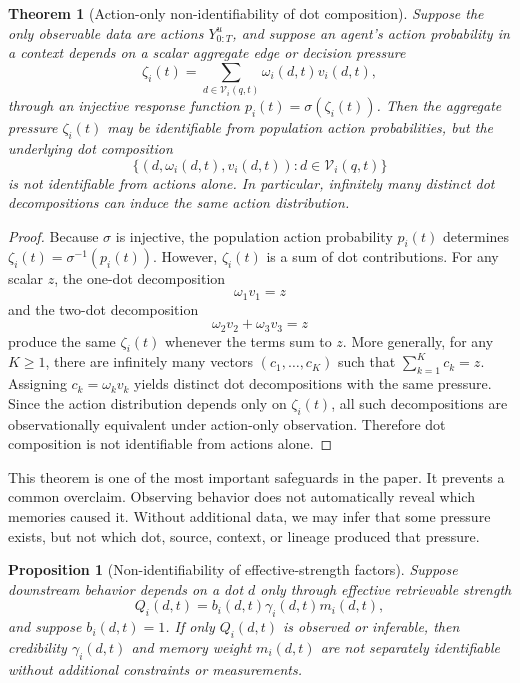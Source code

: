 \documentclass[11pt]{article}
\newtheorem{theorem}{Theorem}
\newtheorem{proposition}{Proposition}
\theoremstyle{remark}
\begin{document}
\begin{theorem}[Action-only non-identifiability of dot composition]\label{thm:action-only-nonidentifiability}
Suppose the only observable data are actions $Y^u_{0:T}$, and suppose an
agent's action probability in a context depends on a scalar aggregate
edge or decision pressure
$$
\zeta_i(t)=\sum_{d\in \mathcal V_i(q,t)}\omega_i(d,t)v_i(d,t),
$$
through an injective response function $p_i(t)=\sigma(\zeta_i(t))$. Then the
aggregate pressure $\zeta_i(t)$ may be identifiable from population action
probabilities, but the underlying dot composition
$$
\{(d,\omega_i(d,t),v_i(d,t)):d\in \mathcal V_i(q,t)\}
$$
is not identifiable from actions alone. In particular, infinitely many
distinct dot decompositions can induce the same action distribution.
\end{theorem}

\begin{proof}
Because $\sigma$ is injective, the population action probability
$p_i(t)$ determines $\zeta_i(t)=\sigma^{-1}(p_i(t))$. However, $\zeta_i(t)$ is a
sum of dot contributions. For any scalar $z$, the one-dot decomposition
$$
\omega_1v_1=z
$$
and the two-dot decomposition
$$
\omega_2v_2+\omega_3v_3=z
$$
produce the same $\zeta_i(t)$ whenever the terms sum to $z$. More generally,
for any $K\geq 1$, there are infinitely many vectors
$(c_1,\ldots,c_K)$ such that $\sum_{k=1}^K c_k=z$. Assigning
$c_k=\omega_kv_k$ yields distinct dot decompositions with the same
pressure. Since the action distribution depends only on $\zeta_i(t)$, all
such decompositions are observationally equivalent under action-only
observation. Therefore dot composition is not identifiable from actions
alone.
\end{proof}

This theorem is one of the most important safeguards in the paper. It
prevents a common overclaim. Observing behavior does not automatically
reveal which memories caused it. Without additional data, we may infer
that some pressure exists, but not which dot, source, context, or
lineage produced that pressure.

\begin{proposition}[Non-identifiability of effective-strength factors]\label{prop:effective-strength-nonidentifiability}
Suppose downstream behavior depends on a dot $d$ only through effective
retrievable strength
$$
Q_i(d,t)=b_i(d,t)\gamma_i(d,t)m_i(d,t),
$$
and suppose $b_i(d,t)=1$. If only $Q_i(d,t)$ is observed or inferable,
then credibility $\gamma_i(d,t)$ and memory weight $m_i(d,t)$ are not
separately identifiable without additional constraints or measurements.
\end{proposition}
\end{document}
